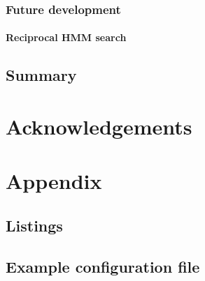 \documentclass[a4paper,12pt]{scrreprt}
\begin{document}
		\subsection{Future development}
			
			\subsubsection{Reciprocal HMM search}
	\section{Summary}

%
{}
\chapter*{Acknowledgements}
	
	\clearpage

%
{}
\footnotesize


\normalsize
\clearpage

%
\appendix
\chapter{Appendix}
	\section{Listings}
		
	\section{Example configuration file}
		
\end{document}
